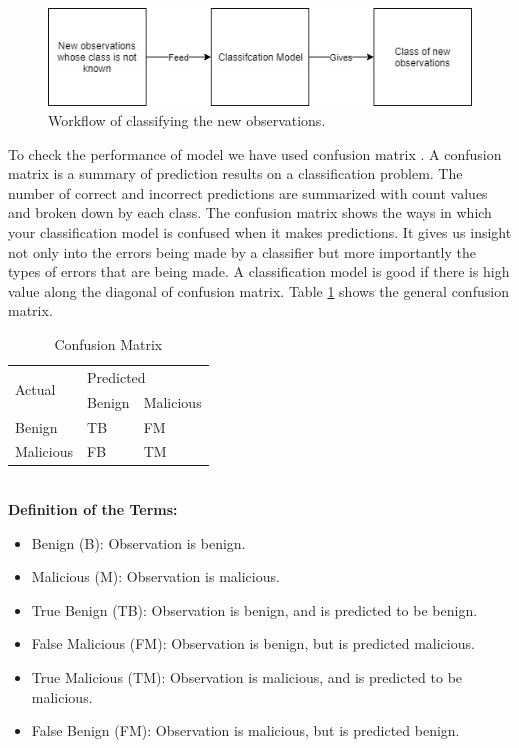 \begin{figure}[!h]
  \centering
  \includegraphics [scale=0.8] {appc2.jpg}
  \caption{Workflow of classifying the new observations.}
  \label{fig:appc2}
\end{figure}
To check the performance of model we have used confusion matrix \cite{wiki:xxx1}. A confusion matrix is a summary of prediction results on a classification problem. The number of correct and incorrect predictions are summarized with count values and broken down by each class. The confusion matrix shows the ways in which your classification model is confused when it makes predictions. It gives us insight not only into the errors being made by a classifier but more importantly the types of errors that are being made. A classification model is good if there is high value along the diagonal of confusion matrix. Table \ref{table:tab1} shows the general confusion matrix.\\
\begin{table}[!h]
\centering

\begin{tabular}{|l||l|l|}
\hline
\multirow{2}{4em}{Actual} & \multicolumn{2}{l|}{Predicted} \\ \cline{2-3} 
                  &    Benign      &    Malicious       \\ \hline
         Benign         &      TB     &     FM      \\ \hline
         Malicious          &     FB      &      TM     \\ \hline
\end{tabular}%

\caption{Confusion Matrix}
\label{table:tab1}
\end{table}\\
\textbf{Definition of the Terms: }
\begin{itemize}
    \item Benign (B): Observation is benign.
    \item Malicious (M): Observation is malicious.
    \item True Benign (TB): Observation is benign, and is predicted to be benign.
    \item False Malicious (FM): Observation is benign, but is predicted malicious.
    \item True Malicious (TM): Observation is malicious, and is predicted to be malicious.
    \item False Benign (FM): Observation is malicious, but is predicted benign.
\end{itemize}

